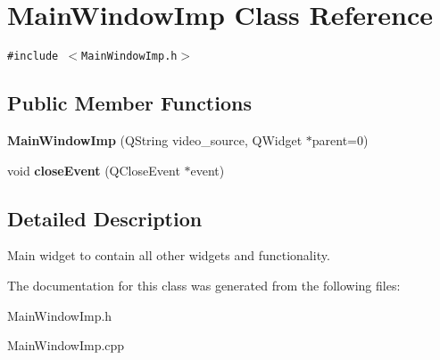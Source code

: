 \hypertarget{classMainWindowImp}{
\section{MainWindowImp Class Reference}
\label{classMainWindowImp}
}
{\tt \#include $<$MainWindowImp.h$>$}

\subsection*{Public Member Functions}
\begin{CompactItemize}
\item 
\hypertarget{classMainWindowImp_3e5ab10422a84407fe1874dfd2ddd82d}{
\textbf{MainWindowImp} (QString video\_\-source, QWidget $\ast$parent=0)}
\label{classMainWindowImp_3e5ab10422a84407fe1874dfd2ddd82d}

\item 
\hypertarget{classMainWindowImp_9d757cd4144a0b93d50eb0a0ce4603a6}{
void \textbf{closeEvent} (QCloseEvent $\ast$event)}
\label{classMainWindowImp_9d757cd4144a0b93d50eb0a0ce4603a6}

\end{CompactItemize}


\subsection{Detailed Description}
Main widget to contain all other widgets and functionality. 

The documentation for this class was generated from the following files:\begin{CompactItemize}
\item 
MainWindowImp.h\item 
MainWindowImp.cpp\end{CompactItemize}
